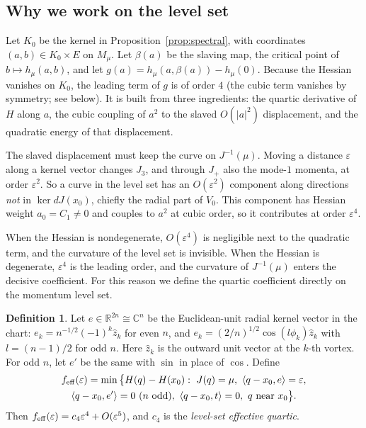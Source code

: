 \documentclass[11pt]{article}
\theoremstyle{definition}
\newtheorem{definition}[theorem]{Definition}
\theoremstyle{remark}
\newcommand{\R}{\mathbb{R}}
\newcommand{\C}{\mathbb{C}}
\begin{document}
\subsection{Why we work on the level set}

Let $K_0$ be the kernel in Proposition~\ref{prop:spectral}, with coordinates $(a,b)\in K_0\times E$ on
$M_\mu$. Let $\beta(a)$ be the slaving map, the critical point of $b\mapsto h_\mu(a,b)$, and let
$g(a)=h_\mu(a,\beta(a))-h_\mu(0)$. Because the Hessian vanishes on $K_0$, the leading term of $g$ is of
order $4$ (the cubic term vanishes by symmetry; see below). It is built from three ingredients: the quartic
derivative of $H$ along $a$, the cubic coupling of $a^2$ to the slaved $O(|a|^2)$ displacement, and the
quadratic energy of that displacement.

The slaved displacement must keep the curve on $J^{-1}(\mu)$. Moving a distance $\varepsilon$ along a
kernel vector changes $J_3$, and through $J_+$ also the mode-$1$ momenta, at order $\varepsilon^2$. So a
curve in the level set has an $O(\varepsilon^2)$ component along directions \emph{not} in
$\ker dJ(x_0)$, chiefly the radial part of $V_0$. This component has Hessian weight $a_0=C_1\ne0$ and
couples to $a^2$ at cubic order, so it contributes at order $\varepsilon^4$.

When the Hessian is nondegenerate, $O(\varepsilon^4)$ is negligible next to the quadratic term, and the
curvature of the level set is invisible. When the Hessian is degenerate, $\varepsilon^4$ is the leading
order, and the curvature of $J^{-1}(\mu)$ enters the decisive coefficient. For this reason we define
the quartic coefficient directly on the momentum level set.

\begin{definition}\label{def:c4}
Let $e\in\R^{2n}\cong\C^n$ be the Euclidean-unit radial kernel vector in the chart:
$e_k=n^{-1/2}(-1)^k\hat z_k$ for even $n$, and $e_k=(2/n)^{1/2}\cos(l\phi_k)\hat z_k$ with
$l=(n-1)/2$ for odd $n$. Here $\hat z_k$ is the outward unit vector at the $k$-th vortex. For odd $n$, let
$e'$ be the same with $\sin$ in place of $\cos$. Define
\begin{multline*}
f_{\rm eff}(\varepsilon)=\min\big\{H(q)-H(x_0):\ J(q)=\mu,\ \langle q-x_0,e\rangle=\varepsilon,\\
\langle q-x_0,e'\rangle=0\ (n\text{ odd}),\ \langle q-x_0,t\rangle=0,\ q\text{ near }x_0\big\}.
\end{multline*}
Then $f_{\rm eff}(\varepsilon)=c_4\varepsilon^4+O(\varepsilon^5)$, and $c_4$ is the \emph{level-set
effective quartic}.
\end{definition}
\end{document}
